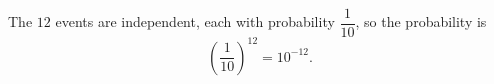 The $12$ events are independent, each with probability $\dfrac1{10}$, so the probability is
\[\left(\dfrac{1}{10}\right)^{12}=\boxed{10^{-12}}.\]
